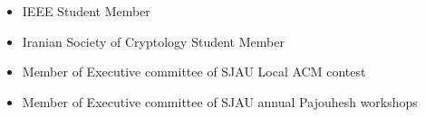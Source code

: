 

\begin{cvparagraph}
  \begin{itemize}[leftmargin=*]
    \item {IEEE Student Member}
    \item {Iranian Society of Cryptology Student Member}
    \item {Member of Executive committee of SJAU Local ACM contest}
    \item {Member of Executive committee of SJAU annual Pajouhesh workshops}
  \end{itemize}
\end{cvparagraph}